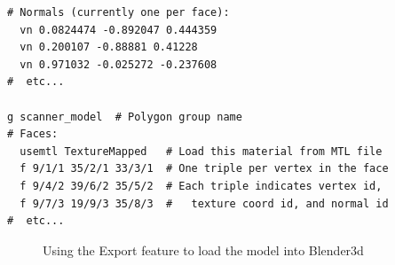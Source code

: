 \documentclass[a4paper,10pt]{article}
\begin{document}
\begin{itemize}
{\begin{verbatim}
# Normals (currently one per face):
  vn 0.0824474 -0.892047 0.444359
  vn 0.200107 -0.88881 0.41228
  vn 0.971032 -0.025272 -0.237608
#  etc...

g scanner_model  # Polygon group name
# Faces:
  usemtl TextureMapped   # Load this material from MTL file
  f 9/1/1 35/2/1 33/3/1  # One triple per vertex in the face
  f 9/4/2 39/6/2 35/5/2  # Each triple indicates vertex id,
  f 9/7/3 19/9/3 35/8/3  #   texture coord id, and normal id
#  etc...
\end{verbatim}

\begin{figure}
  \begin{center}
  \end{center}
  \caption{Using the Export feature to load the model into Blender3d}
  \label{blender}
\end{figure}

}
\end{itemize}
\end{document}
